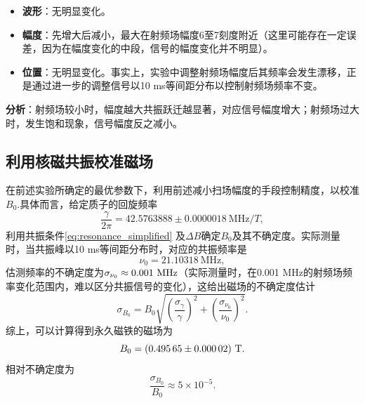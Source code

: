 \documentclass[font=default]{mpltx}
\begin{document}
\begin{enumerate}
  \begin{itemize}
  \item \textbf{波形}：无明显变化。
  \item \textbf{幅度}：先增大后减小，最大在射频场幅度6至7刻度附近（这里可能存在一定误差，因为在幅度变化的中段，信号的幅度变化并不明显）。
  \item \textbf{位置}：无明显变化。事实上，实验中调整射频场幅度后其频率会发生漂移，正是通过进一步的调整信号以10 ms等间距分布以控制射频场频率不变。
  \end{itemize}
  \textbf{分析}：射频场较小时，幅度越大共振跃迁越显著，对应信号幅度增大；射频场过大时，发生饱和现象，信号幅度反之减小。
\end{enumerate}
\subsection{利用核磁共振校准磁场}
在前述实验所确定的最优参数下，利用前述减小扫场幅度的手段控制精度，以校准$B_0$.具体而言，给定质子的回旋频率
\begin{equation}
  \frac{\gamma}{2\pi}=\num{ 42.5763888} \pm \SI{ 0.0000018}{\MHz/T},
\end{equation}利用共振条件\autoref{eq:resonance_simplified} 及$\Delta B$确定$B_0$及其不确定度。实际测量时，当共振峰以10 ms等间距分布时，对应的共振频率是
	\begin{equation}
		\nu_0 = \SI{21.10318}{\MHz},
	\end{equation}
	估测频率的不确定度为$\sigma_{\nu_0}\approx 0.001\ {\rm MHz}$（实际测量时，在0.001 MHz的射频场频率变化范围内，难以区分共振信号的变化），这给出磁场的不确定度估计
	\begin{equation}
		\sigma_{B_0} = B_0\sqrt{\left(\frac{\sigma_{\gamma}}{\gamma}\right)^2+\left(\frac{\sigma_{\nu_0}}{\nu_0}\right)^2}.
	\end{equation}
	综上，可以计算得到永久磁铁的磁场为
	\begin{equation}
		B_0 = (\num{0.49565}\pm \num{0.00002})\ {\rm T}.
	\end{equation}
	相对不确定度为
\begin{equation}
  \frac{\sigma_{B_0}}{B_0}\approx5\times10^{-5}.
\end{equation}
\end{document}
